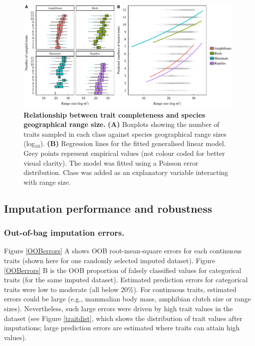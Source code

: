 \begin{figure}[h!]
\centering
\includegraphics[scale=0.7]{figures/chapter2/NA_spatial_patterns/Poisson_model_predictions}
\caption[Relationship between trait completeness and species geographical range size]{\textbf{Relationship between trait completeness and species geographical range size.} \textbf{(A)} Boxplots showing the number of traits sampled in each class against species geographical range sizes (log$_{10}$). \textbf{(B)} Regression lines for the fitted generalised linear model. Grey points represent empirical values (not colour coded for better visual clarity). The model was fitted using a Poisson error distribution. Class was added as an explanatory variable interacting with range size.}
\label{poisson}
\end{figure}


\subsection{Imputation performance and robustness}

\subsubsection{Out-of-bag imputation errors.}
Figure \ref{OOBerrors} A shows OOB root-mean-square errors for each continuous traits (shown here for one randomly selected imputed dataset). Figure \ref{OOBerrors} B is the OOB proportion of falsely classified values for categorical traits (for the same imputed dataset).
Estimated prediction errors for categorical traits were low to moderate (all below 20\%). For continuous traits, estimated errors could be large (e.g., mammalian body mass, amphibian clutch size  or range sizes). Nevertheless, such large errors were driven by high trait values in the dataset (see Figure \ref{traitdist}, which shows the distribution of trait values after imputations; large prediction errors are estimated where traits can attain high values). 
 
